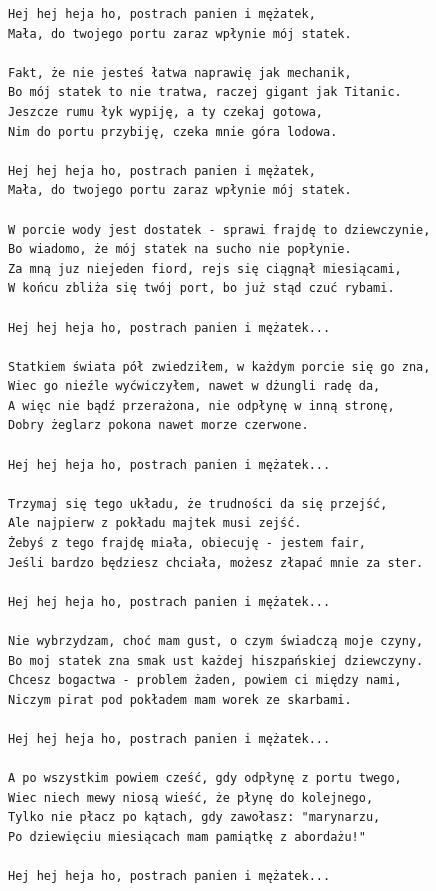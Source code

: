 \documentclass[12pt]{article}
\begin{document}
\begin{verbatim}
Hej hej heja ho, postrach panien i mężatek,
Mała, do twojego portu zaraz wpłynie mój statek.

Fakt, że nie jesteś łatwa naprawię jak mechanik,
Bo mój statek to nie tratwa, raczej gigant jak Titanic.
Jeszcze rumu łyk wypiję, a ty czekaj gotowa,
Nim do portu przybiję, czeka mnie góra lodowa.

Hej hej heja ho, postrach panien i mężatek,
Mała, do twojego portu zaraz wpłynie mój statek.

W porcie wody jest dostatek - sprawi frajdę to dziewczynie,
Bo wiadomo, że mój statek na sucho nie popłynie.
Za mną juz niejeden fiord, rejs się ciągnął miesiącami,
W końcu zbliża się twój port, bo już stąd czuć rybami.

Hej hej heja ho, postrach panien i mężatek...

Statkiem świata pół zwiedziłem, w każdym porcie się go zna,
Wiec go nieźle wyćwiczyłem, nawet w dżungli radę da,
A więc nie bądź przerażona, nie odpłynę w inną stronę,
Dobry żeglarz pokona nawet morze czerwone.

Hej hej heja ho, postrach panien i mężatek...

Trzymaj się tego układu, że trudności da się przejść,
Ale najpierw z pokładu majtek musi zejść.
Żebyś z tego frajdę miała, obiecuję - jestem fair,
Jeśli bardzo będziesz chciała, możesz złapać mnie za ster.

Hej hej heja ho, postrach panien i mężatek...

Nie wybrzydzam, choć mam gust, o czym świadczą moje czyny,
Bo moj statek zna smak ust każdej hiszpańskiej dziewczyny.
Chcesz bogactwa - problem żaden, powiem ci między nami,
Niczym pirat pod pokładem mam worek ze skarbami.

Hej hej heja ho, postrach panien i mężatek...

A po wszystkim powiem cześć, gdy odpłynę z portu twego,
Wiec niech mewy niosą wieść, że płynę do kolejnego,
Tylko nie płacz po kątach, gdy zawołasz: "marynarzu,
Po dziewięciu miesiącach mam pamiątkę z abordażu!"

Hej hej heja ho, postrach panien i mężatek...
\end{verbatim}
\clearpage
\end{document}
